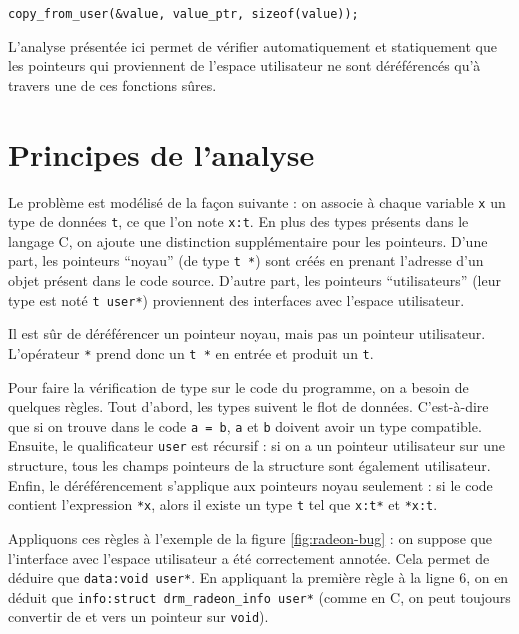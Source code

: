 \begin{Verbatim}
copy_from_user(&value, value_ptr, sizeof(value));
\end{Verbatim}

L'analyse présentée ici permet de vérifier automatiquement et statiquement que
les pointeurs qui proviennent de l'espace utilisateur ne sont déréférencés qu'à
travers une de ces fonctions sûres.

\section{Principes de l'analyse}

Le problème est modélisé de la façon suivante : on associe à chaque variable
\texttt{x} un type de données \texttt{t}, ce que l'on note \texttt{x:t}. En
plus des types présents dans le langage C, on ajoute une distinction
supplémentaire pour les pointeurs. D'une part, les pointeurs ``noyau'' (de type
\texttt{t~*}) sont créés en prenant l'adresse d'un objet présent dans le code
source. D'autre part, les pointeurs ``utilisateurs'' (leur type est noté
\texttt{t user*}) proviennent des interfaces avec l'espace utilisateur.

Il est sûr de déréférencer un pointeur noyau, mais pas un pointeur
utilisateur. L'opérateur \texttt{*} prend donc un \texttt{t *} en entrée
et produit un \texttt{t}.

Pour faire la vérification de type sur le code du programme, on a besoin de
quelques règles. Tout d'abord, les types suivent le flot de données.
C'est-à-dire que si on trouve dans le code \texttt{a = b}, \texttt{a} et
\texttt{b} doivent avoir un type compatible. Ensuite, le qualificateur
\texttt{user} est récursif : si on a un pointeur utilisateur sur une structure,
tous les champs pointeurs de la structure sont également utilisateur. Enfin, le
déréférencement s'applique aux pointeurs noyau seulement : si le code contient
l'expression \texttt{*x}, alors il existe un type \texttt{t} tel que
\texttt{x:t*} et \texttt{*x:t}.

Appliquons ces règles à l'exemple de la figure \ref{fig:radeon-bug} : on suppose
que l'interface avec l'espace utilisateur a été correctement annotée. Cela
permet de déduire que \texttt{data:void user*}. En appliquant la première règle
à la ligne 6, on en déduit que \texttt{info:struct drm\_radeon\_info user*}
(comme en C, on peut toujours convertir de et vers un pointeur sur
\texttt{void}).

